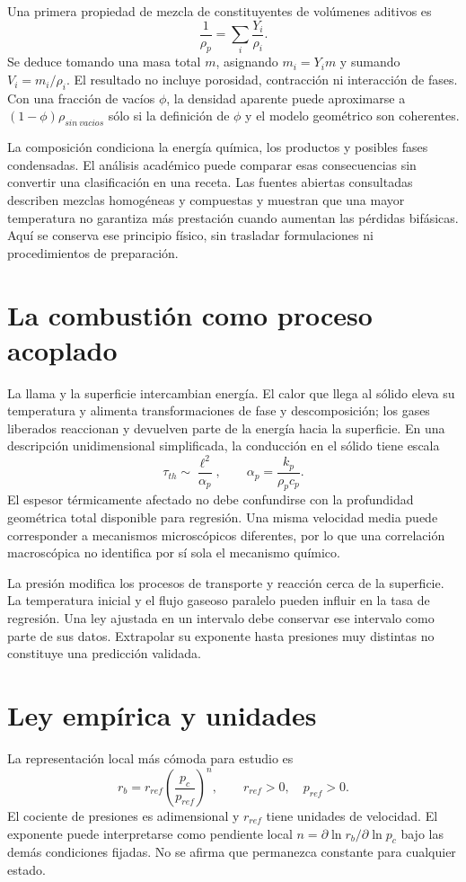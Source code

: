 Una primera propiedad de mezcla de constituyentes de volúmenes aditivos es
\[
 \frac1{\rho_p}=\sum_i\frac{Y_i}{\rho_i}.
\]
Se deduce tomando una masa total $m$, asignando $m_i=Y_im$ y sumando $V_i=m_i/\rho_i$. El resultado no incluye porosidad, contracción ni interacción de fases. Con una fracción de vacíos $\phi$, la densidad aparente puede aproximarse a $(1-\phi)\rho_{sin\ vacios}$ sólo si la definición de $\phi$ y el modelo geométrico son coherentes.

La composición condiciona la energía química, los productos y posibles fases condensadas. El análisis académico puede comparar esas consecuencias sin convertir una clasificación en una receta. Las fuentes abiertas consultadas describen mezclas homogéneas y compuestas y muestran que una mayor temperatura no garantiza más prestación cuando aumentan las pérdidas bifásicas. Aquí se conserva ese principio físico, sin trasladar formulaciones ni procedimientos de preparación.\cite{MIT16,MIT17}
\section{La combustión como proceso acoplado}
La llama y la superficie intercambian energía. El calor que llega al sólido eleva su temperatura y alimenta transformaciones de fase y descomposición; los gases liberados reaccionan y devuelven parte de la energía hacia la superficie. En una descripción unidimensional simplificada, la conducción en el sólido tiene escala
\[
 \tau_{th}\sim\frac{\ell^2}{\alpha_p},\qquad
 \alpha_p=\frac{k_p}{\rho_pc_p}.
\]
El espesor térmicamente afectado no debe confundirse con la profundidad geométrica total disponible para regresión. Una misma velocidad media puede corresponder a mecanismos microscópicos diferentes, por lo que una correlación macroscópica no identifica por sí sola el mecanismo químico.

La presión modifica los procesos de transporte y reacción cerca de la superficie. La temperatura inicial y el flujo gaseoso paralelo pueden influir en la tasa de regresión. Una ley ajustada en un intervalo debe conservar ese intervalo como parte de sus datos. Extrapolar su exponente hasta presiones muy distintas no constituye una predicción validada.
\section{Ley empírica y unidades}
La representación local más cómoda para estudio es
\begin{equation}\label{eq:burnlaw}
 r_b=r_{ref}\left(\frac{p_c}{p_{ref}}\right)^n,
 \qquad r_{ref}>0,\quad p_{ref}>0.
\end{equation}
El cociente de presiones es adimensional y $r_{ref}$ tiene unidades de velocidad. El exponente puede interpretarse como pendiente local $n=\partial\ln r_b/\partial\ln p_c$ bajo las demás condiciones fijadas. No se afirma que permanezca constante para cualquier estado.

